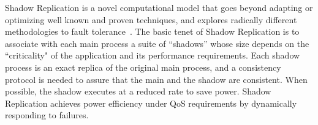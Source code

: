 
Shadow Replication is a novel computational model that goes beyond adapting or optimizing well known and proven techniques, and explores radically different methodologies to fault tolerance~\cite{mills_2014_icnc,mills_2014_pdp,mills2014power}. %
The basic tenet of Shadow Replication is to associate with each main process a suite of “shadows” whose size depends on the 
``criticality" of the application and its performance requirements. Each shadow process is an exact replica of the original 
main process, 
and a consistency protocol is needed to assure that the main and the shadow are consistent.  
When possible, the shadow executes at a reduced rate to save power.
Shadow Replication achieves power efficiency under QoS requirements by dynamically responding to failures. 

